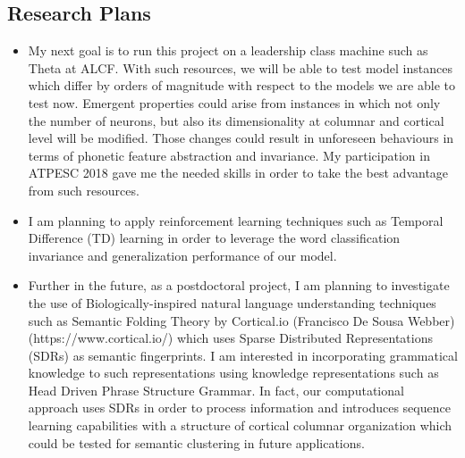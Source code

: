 \documentclass{article}
\begin{document}
\subsection*{Research Plans}
\begin{itemize}
	\item My next goal is to run this project on a leadership class machine such as Theta at ALCF. With such resources, we will be able to test model instances which differ by orders of magnitude with respect to the models we are able to test now. Emergent properties could arise from instances in which not only the number of neurons, but also its dimensionality at columnar and cortical level will be modified. Those changes could result in unforeseen behaviours in terms of phonetic feature abstraction and invariance. My participation in ATPESC 2018 gave me the needed skills in order to take the best advantage from such resources.

	\item I am planning to apply reinforcement learning techniques such as Temporal Difference (TD) learning in order to leverage the word classification invariance and generalization performance of our model.

	\item Further in the future, as a postdoctoral project, I am planning to investigate the use of Biologically-inspired natural language understanding techniques such as Semantic Folding Theory by Cortical.io (Francisco De Sousa Webber) (https://www.cortical.io/) which uses Sparse Distributed Representations (SDRs) as semantic fingerprints. I am interested in incorporating grammatical knowledge to such representations using knowledge representations such as Head Driven Phrase Structure Grammar. In fact, our computational approach uses SDRs in order to process information and introduces sequence learning capabilities with a structure of cortical columnar organization which could be tested for semantic clustering in future applications.
\end{itemize}
\end{document}
